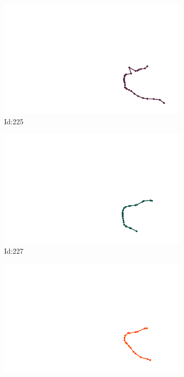 \documentclass[12pt,twoside]{report}
\begin{document}
\begin{figure}
\centering
\begin{subfigure}[b]{0.20\textwidth}
\centering
\includegraphics[width=\textwidth]{../../trajectories/225.png}
\caption{Id:225}
\end{subfigure}
\begin{subfigure}[b]{0.20\textwidth}
\centering
\includegraphics[width=\textwidth]{../../trajectories/227.png}
\caption{Id:227}
\end{subfigure}
\begin{subfigure}[b]{0.20\textwidth}
\centering
\includegraphics[width=\textwidth]{../../trajectories/230.png}

\end{subfigure}
\end{figure}
\end{document}
